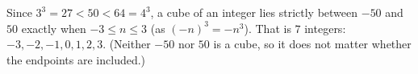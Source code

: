 Since $3^3=27<50<64=4^3$, a cube of an integer lies strictly between $-50$ and $50$ exactly when $-3\le n\le3$ (as $(-n)^3=-n^3$). That is $\boxed{7}$ integers: $-3,-2,-1,0,1,2,3$. (Neither $-50$ nor $50$ is a cube, so it does not matter whether the endpoints are included.)
